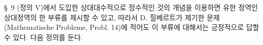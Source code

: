 
\S\ 9 (정의 V)에서 도입한 
\glqq{}상대대수적으로 정수적인 것\grqq{}의 개념을 이용하면 유한 정역인 상대정역의 한 부류를 제시할 수 있고, 따라서 D. 힐베르트가 제기한 문제(Mathematische Probleme, Probl. 14)에 적어도 이 부류에 대해서는 긍정적으로 답할 수 있다. 다음 정의를 둔다.
